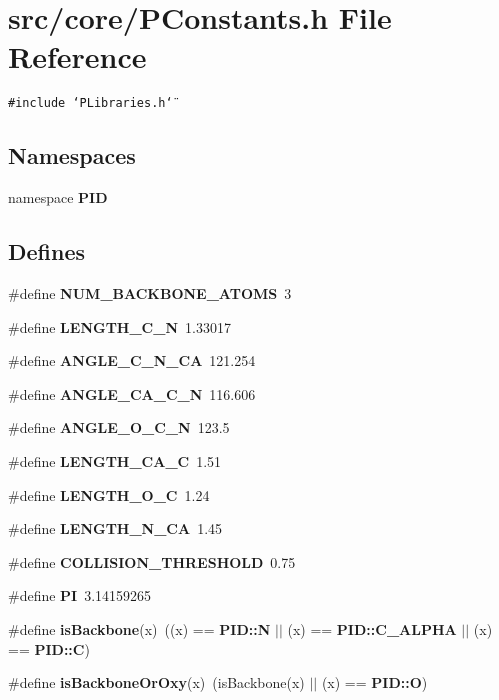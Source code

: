 \section{src/core/PConstants.h File Reference}
\label{PConstants_8h}


{\tt \#include \char`\"{}PLibraries.h\char`\"{}}\par
\subsection*{Namespaces}
\begin{CompactItemize}
\item 
namespace {\bf PID}
\end{CompactItemize}
\subsection*{Defines}
\begin{CompactItemize}
\item 
\#define {\bf NUM\_\-BACKBONE\_\-ATOMS}~3
\item 
\#define {\bf LENGTH\_\-C\_\-N}~1.33017
\item 
\#define {\bf ANGLE\_\-C\_\-N\_\-CA}~121.254
\item 
\#define {\bf ANGLE\_\-CA\_\-C\_\-N}~116.606
\item 
\#define {\bf ANGLE\_\-O\_\-C\_\-N}~123.5
\item 
\#define {\bf LENGTH\_\-CA\_\-C}~1.51
\item 
\#define {\bf LENGTH\_\-O\_\-C}~1.24
\item 
\#define {\bf LENGTH\_\-N\_\-CA}~1.45
\item 
\#define {\bf COLLISION\_\-THRESHOLD}~0.75
\item 
\#define {\bf PI}~3.14159265
\item 
\#define {\bf is\-Backbone}(x)~((x) == {\bf PID::N} $|$$|$ (x) == {\bf PID::C\_\-ALPHA} $|$$|$ (x) == {\bf PID::C})
\item 
\#define {\bf is\-Backbone\-Or\-Oxy}(x)~(is\-Backbone(x) $|$$|$ (x) == {\bf PID::O})
\end{CompactItemize}
